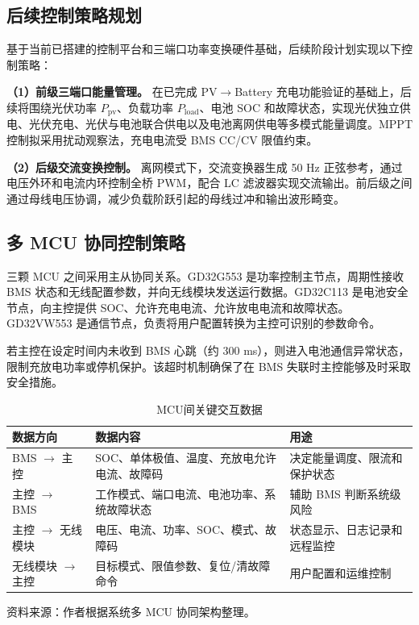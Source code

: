 \subsection{后续控制策略规划}

基于当前已搭建的控制平台和三端口功率变换硬件基础，后续阶段计划实现以下控制策略：

\textbf{（1）前级三端口能量管理。} 在已完成 PV$\rightarrow$Battery 充电功能验证的基础上，后续将围绕光伏功率 $P_{\mathrm{pv}}$、负载功率 $P_{\mathrm{load}}$、电池 SOC 和故障状态，实现光伏独立供电、光伏充电、光伏与电池联合供电以及电池离网供电等多模式能量调度。MPPT 控制拟采用扰动观察法，充电电流受 BMS CC/CV 限值约束。

\textbf{（2）后级交流变换控制。} 离网模式下，交流变换器生成 50 Hz 正弦参考，通过电压外环和电流内环控制全桥 PWM，配合 LC 滤波器实现交流输出。前后级之间通过母线电压协调，减少负载阶跃引起的母线过冲和输出波形畸变。

\subsection{多 MCU 协同控制策略}

三颗 MCU 之间采用主从协同关系。GD32G553 是功率控制主节点，周期性接收 BMS 状态和无线配置参数，并向无线模块发送运行数据。GD32C113 是电池安全节点，向主控提供 SOC、允许充电电流、允许放电电流和故障状态。GD32VW553 是通信节点，负责将用户配置转换为主控可识别的参数命令。

若主控在设定时间内未收到 BMS 心跳（约 300 ms），则进入电池通信异常状态，限制充放电功率或停机保护。该超时机制确保了在 BMS 失联时主控能够及时采取安全措施。

\begin{table}[htbp]
  \centering
  \caption{MCU间关键交互数据}
  \label{tab:mcu_data}
  \begin{tabular}{@{}lp{5.2cm}p{6.8cm}@{}}
    \toprule
    \textbf{数据方向} & \textbf{数据内容} & \textbf{用途} \\
    \midrule
    BMS $\rightarrow$ 主控     & SOC、单体极值、温度、充放电允许电流、故障码 & 决定能量调度、限流和保护状态 \\
    主控 $\rightarrow$ BMS     & 工作模式、端口电流、电池功率、系统故障状态 & 辅助 BMS 判断系统级风险 \\
    主控 $\rightarrow$ 无线模块 & 电压、电流、功率、SOC、模式、故障码 & 状态显示、日志记录和远程监控 \\
    无线模块 $\rightarrow$ 主控 & 目标模式、限值参数、复位/清故障命令 & 用户配置和运维控制 \\
    \bottomrule
  \end{tabular}
\end{table}
\vspace{-0.3em}
{\small 资料来源：作者根据系统多 MCU 协同架构整理。}
